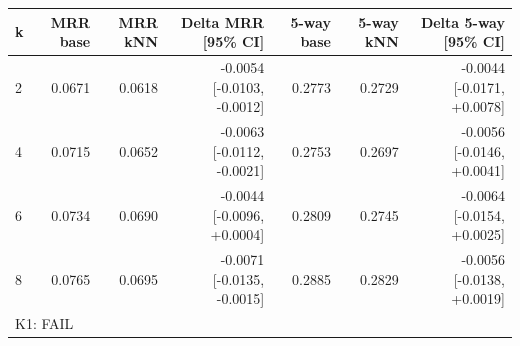 \begin{tabular}{lrrrrrr}
\toprule
k & MRR base & MRR kNN & Delta MRR [95\% CI] & 5-way base & 5-way kNN & Delta 5-way [95\% CI] \\
\midrule
2 & 0.0671 & 0.0618 & -0.0054 [-0.0103, -0.0012] & 0.2773 & 0.2729 & -0.0044 [-0.0171, +0.0078] \\
4 & 0.0715 & 0.0652 & -0.0063 [-0.0112, -0.0021] & 0.2753 & 0.2697 & -0.0056 [-0.0146, +0.0041] \\
6 & 0.0734 & 0.0690 & -0.0044 [-0.0096, +0.0004] & 0.2809 & 0.2745 & -0.0064 [-0.0154, +0.0025] \\
8 & 0.0765 & 0.0695 & -0.0071 [-0.0135, -0.0015] & 0.2885 & 0.2829 & -0.0056 [-0.0138, +0.0019] \\
\midrule
\multicolumn{7}{l}{K1: FAIL} \\
\bottomrule
\end{tabular}
